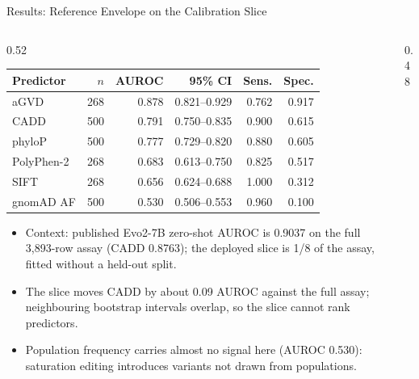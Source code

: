 \documentclass[aspectratio=169,10pt]{beamer}
\begin{document}
\begin{frame}{Results: Reference Envelope on the Calibration Slice}
\begin{columns}[T]
\begin{column}{0.52\textwidth}
\footnotesize
\begin{tabular}{@{}lrrrrr@{}}
\toprule
Predictor & $n$ & AUROC & 95\% CI & Sens. & Spec. \\
\midrule
aGVD & 268 & 0.878 & 0.821--0.929 & 0.762 & 0.917 \\
CADD & 500 & 0.791 & 0.750--0.835 & 0.900 & 0.615 \\
phyloP & 500 & 0.777 & 0.729--0.820 & 0.880 & 0.605 \\
PolyPhen-2 & 268 & 0.683 & 0.613--0.750 & 0.825 & 0.517 \\
SIFT & 268 & 0.656 & 0.624--0.688 & 1.000 & 0.312 \\
gnomAD AF & 500 & 0.530 & 0.506--0.553 & 0.960 & 0.100 \\
\bottomrule
\end{tabular}
\begin{itemize}\small
\item Context: published Evo2-7B zero-shot AUROC is 0.9037 on the full 3,893-row assay (CADD 0.8763); the deployed slice is 1/8 of the assay, fitted without a held-out split.
\item The slice moves CADD by about 0.09 AUROC against the full assay; neighbouring bootstrap intervals overlap, so the slice cannot rank predictors.
\item Population frequency carries almost no signal here (AUROC 0.530): saturation editing introduces variants not drawn from populations.
\end{itemize}
\end{column}
\begin{column}{0.48\textwidth}
\centering
{}
\end{column}
\end{columns}
\end{frame}
\end{document}
